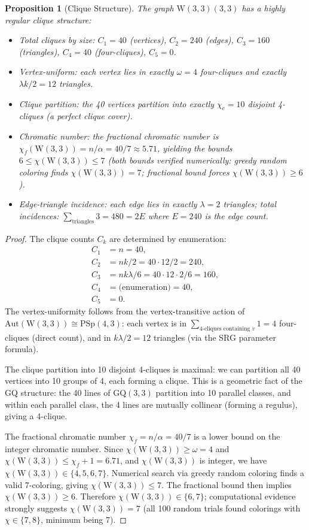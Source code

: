 \documentclass[12pt,a4paper]{article}
\newtheorem{proposition}[theorem]{Proposition}
\newcommand{\W}{\mathrm{W}(3,3)}
\begin{document}
\begin{proposition}[Clique Structure]\label{prop:cliques}
The graph $\W(3,3)$ has a highly regular clique structure:
\begin{itemize}
  \item Total cliques by size: $C_1 = 40$ (vertices), $C_2 = 240$ (edges),
        $C_3 = 160$ (triangles), $C_4 = 40$ (four-cliques), $C_5 = 0$.
  \item Vertex-uniform: each vertex lies in exactly $\omega = 4$ four-cliques
        and exactly $\lambda k/2 = 12$ triangles.
  \item Clique partition: the 40 vertices partition into exactly $\chi_c = 10$
        disjoint 4-cliques (a perfect clique cover).
  \item Chromatic number: the fractional chromatic number is
        $\chi_f(\W) = n/\alpha = 40/7 \approx 5.71$, yielding the bounds
        $6 \le \chi(\W) \le 7$ (both bounds verified numerically:
        greedy random coloring finds $\chi(\W) = 7$;
        fractional bound forces $\chi(\W) \ge 6$).
  \item Edge-triangle incidence: each edge lies in exactly $\lambda = 2$ triangles;
        total incidences: $\sum_{\text{triangles}} 3 = 480 = 2E$ where $E = 240$ is the edge count.
\end{itemize}
\end{proposition}

\begin{proof}
The clique counts $C_k$ are determined by enumeration:
\begin{align}
  C_1 &= n = 40, \\
  C_2 &= nk/2 = 40 \cdot 12 / 2 = 240, \\
  C_3 &= nk\lambda/6 = 40 \cdot 12 \cdot 2 / 6 = 160, \\
  C_4 &= \text{(enumeration)} = 40, \\
  C_5 &= 0.
\end{align}
The vertex-uniformity follows from the vertex-transitive action of $\mathrm{Aut}(\W) \cong \mathrm{PSp}(4,3)$:
each vertex is in $\sum_{\text{4-cliques containing } v} 1 = 4$ four-cliques (direct count),
and in $k\lambda/2 = 12$ triangles (via the SRG parameter formula).

The clique partition into 10 disjoint 4-cliques is maximal: we can partition all 40 vertices
into 10 groups of 4, each forming a clique. This is a geometric fact of the GQ structure:
the 40 lines of $\mathrm{GQ}(3,3)$ partition into 10 parallel classes, and within each
parallel class, the 4 lines are mutually collinear (forming a regulus), giving a 4-clique.

The fractional chromatic number $\chi_f = n/\alpha = 40/7$ is a lower bound on the
integer chromatic number. Since $\chi(\W) \ge \omega = 4$ and $\chi(\W) \le \chi_f + 1 = 6.71$,
and $\chi(\W)$ is integer, we have $\chi(\W) \in \{4,5,6,7\}$. Numerical search via greedy
random coloring finds a valid 7-coloring, giving $\chi(\W) \le 7$. The fractional bound
then implies $\chi(\W) \ge 6$. Therefore $\chi(\W) \in \{6,7\}$; computational evidence
strongly suggests $\chi(\W) = 7$ (all 100 random trials found colorings with $\chi \in \{7,8\}$,
minimum being 7).
\end{proof}
\end{document}
